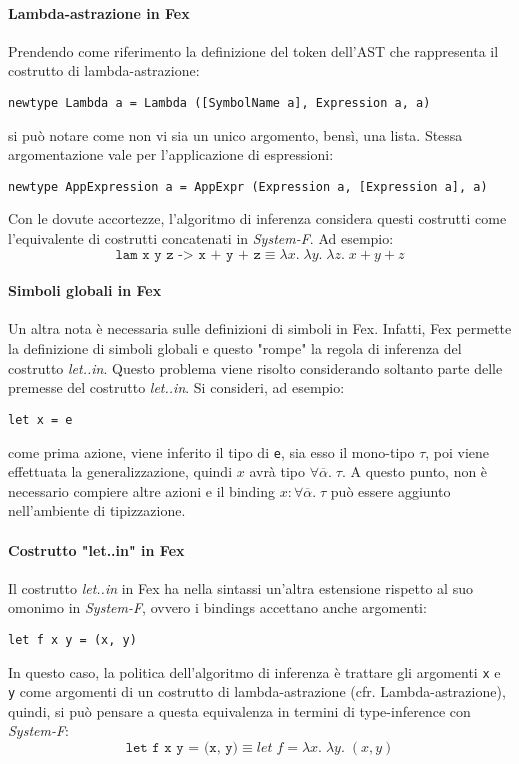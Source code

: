 \documentclass[10pt,a4paper]{article}
\begin{document}
\hypertarget{Lambda-astrazione in Fex}{\paragraph{Lambda-astrazione in Fex}}
Prendendo come riferimento la definizione del token
dell'AST che rappresenta il costrutto di lambda-astrazione:
\begin{lstlisting}
newtype Lambda a = Lambda ([SymbolName a], Expression a, a)
\end{lstlisting}
si può notare come non vi sia un unico argomento, bensì, una lista. Stessa argomentazione vale per l'applicazione
di espressioni:
\begin{lstlisting}
newtype AppExpression a = AppExpr (Expression a, [Expression a], a)
\end{lstlisting}
Con le dovute accortezze, l'algoritmo di inferenza considera questi costrutti come l'equivalente di costrutti
concatenati in \textit{System-F}. Ad esempio:
\[ \texttt{lam x y z -> x + y + z} \equiv \lambda x. \; \lambda y. \; \lambda z. \; x + y + z \]

\hypertarget{Simboli globali in Fex}{\paragraph{Simboli globali in Fex}}
Un altra nota è necessaria sulle definizioni di simboli in Fex. Infatti, Fex permette la definizione di simboli
globali e questo "rompe" la regola di inferenza del costrutto \textit{let..in}. Questo problema viene risolto
considerando soltanto parte delle premesse del costrutto \textit{let..in}. Si consideri, ad esempio:
\begin{lstlisting}
let x = e
\end{lstlisting}
come prima azione, viene inferito il tipo di \texttt{e}, sia esso il mono-tipo $ \tau $, poi viene effettuata la
generalizzazione, quindi $ x $ avrà tipo $ \forall \overline{\alpha}. \; \tau $. A questo punto, non è necessario
compiere altre azioni e il binding $ x : \forall \overline{\alpha}. \; \tau $ può essere aggiunto nell'ambiente di
tipizzazione.

\hypertarget{Costrutto "let..in" in Fex}{\paragraph{Costrutto "let..in" in Fex}}
Il costrutto \textit{let..in} in Fex ha nella sintassi un'altra estensione rispetto al suo omonimo in \textit{System-F},
ovvero i bindings accettano anche argomenti:
\begin{lstlisting}
let f x y = (x, y)
\end{lstlisting}
In questo caso, la politica dell'algoritmo di inferenza è trattare gli argomenti \texttt{x} e \texttt{y} come argomenti
di un costrutto di lambda-astrazione (cfr. Lambda-astrazione), quindi, si può pensare a questa equivalenza in termini
di type-inference con \textit{System-F}:
\[ \texttt{let f x y = (x, y)} \equiv let \; f = \lambda x. \; \lambda y. \; (x, y) \]
\end{document}
